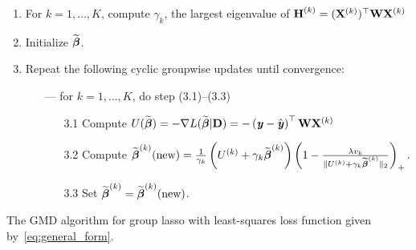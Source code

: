 \begin{algorithm}
	\begin{enumerate}
		\item For $k=1,\ldots,K$, compute $\gamma_k$, the largest eigenvalue of $\textbf{H}^{(k)} = (\mathbf{X}^{(k)})^{\top}\mathbf{W}\mathbf{X}^{(k)}$
		\item Initialize $\widetilde {\boldsymbol{\beta}}$.
		\item Repeat the following cyclic groupwise updates until convergence:
		\begin{enumerate}
			\item[---] for $k=1,\ldots,K$, do step (3.1)--(3.3)
			\begin{enumerate}
				\item[3.1]
				Compute $U(\widetilde {\boldsymbol{\beta}} )=-\nabla L(\widetilde {\boldsymbol{\beta}} | \textbf{D})= -\left(\textbf{\emph{y}}-\hat{\textbf{\emph{y}}}\right)^{\top}\mathbf{W}\mathbf{X}^{(k)}$
				\item[3.2]
				Compute
				$
				\widetilde {\boldsymbol{\beta}}^{(k)}(\textrm{new}) = \frac{1}{\gamma_k}\left( U^{(k)}+\gamma_k \widetilde {\boldsymbol{\beta}}^{(k)} \right)\left(1-\frac{\lambda v_k}{\Vert U^{(k)}+\gamma_k \widetilde {\boldsymbol{\beta}}^{(k)} \Vert_2}\right)_{+} .
				$
				\item[3.3]
				Set $\widetilde {\boldsymbol{\beta}}^{(k)}=\widetilde {\boldsymbol{\beta}}^{(k)}(\textrm{new})$.
			\end{enumerate}
		\end{enumerate}
	\end{enumerate}
	\caption{The GMD algorithm for group lasso with least-squares loss function given by~\eqref{eq:general_form}. \label{alg1}}
\end{algorithm}


